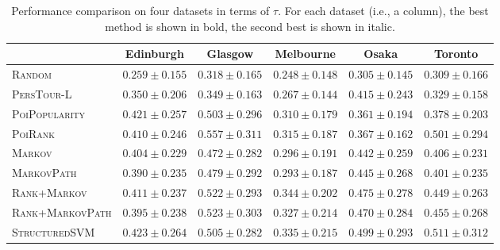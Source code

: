 \begin{table*}
\centering
\begin{tabular}{l|ccccc} \hline
 & Edinburgh & Glasgow & Melbourne & Osaka & Toronto \\ \hline
\textsc{Random} & $0.259\pm0.155$ & $0.318\pm0.165$ & $0.248\pm0.148$ & $0.305\pm0.145$ & $0.309\pm0.166$ \\
\textsc{PersTour-L} & $0.350\pm0.206$ & $0.349\pm0.163$ & $0.267\pm0.144$ & $0.415\pm0.243$ & $0.329\pm0.158$ \\
\textsc{PoiPopularity} & $\mathit{0.421\pm0.257}$ & $0.503\pm0.296$ & $0.310\pm0.179$ & $0.361\pm0.194$ & $0.378\pm0.203$ \\
\textsc{PoiRank} & $0.410\pm0.246$ & $\mathbf{0.557\pm0.311}$ & $0.315\pm0.187$ & $0.367\pm0.162$ & $\mathit{0.501\pm0.294}$ \\
\textsc{Markov} & $0.404\pm0.229$ & $0.472\pm0.282$ & $0.296\pm0.191$ & $0.442\pm0.259$ & $0.406\pm0.231$ \\
\textsc{MarkovPath} & $0.390\pm0.235$ & $0.479\pm0.292$ & $0.293\pm0.187$ & $0.445\pm0.268$ & $0.401\pm0.235$ \\
\textsc{Rank+Markov} & $0.411\pm0.237$ & $0.522\pm0.293$ & $\mathbf{0.344\pm0.202}$ & $\mathit{0.475\pm0.278}$ & $0.449\pm0.263$ \\
\textsc{Rank+MarkovPath} & $0.395\pm0.238$ & $\mathit{0.523\pm0.303}$ & $0.327\pm0.214$ & $0.470\pm0.284$ & $0.455\pm0.268$ \\
\textsc{StructuredSVM} & $\mathbf{0.423\pm0.264}$ & $0.505\pm0.282$ & $\mathit{0.335\pm0.215}$ & $\mathbf{0.499\pm0.293}$ & $\mathbf{0.511\pm0.312}$ \\
\hline
\end{tabular}
\caption{Performance comparison on four datasets in terms of $\tau$.
         For each dataset (i.e., a column), the best method is shown in bold, the second best is shown in italic.}
\label{table:tau}
\end{table*}


